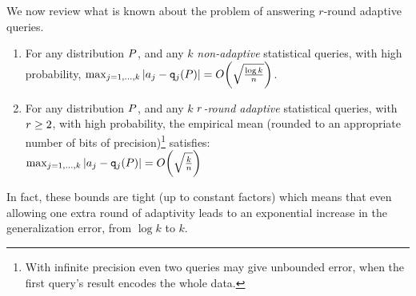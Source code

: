 We now review what is known about the problem of answering $r$-round adaptive queries.  
\begin{thm} 
\label{thm:nonadapt-adapt}
\begin{enumerate}

\item For any distribution $P$, and any $k$ \emph{non-adaptive} statistical queries, with high probability,
$
\max_{j=1,\dots,k} | \answer_j - \qquery_j(\dist) | = O\left( \sqrt{\frac{\log k}{n}}  \right)
$.
%
\item For any distribution $P$, and  any $k$  \emph{$r$-round adaptive} statistical queries, with $r \geq 2$, with high probability, the empirical mean (rounded to an appropriate number of bits of precision)\footnote{With infinite precision even two queries may give unbounded error, when the first query's result encodes the whole data.} satisfies:\\
$
\max_{j=1,\dots,k} | \answer_j - \qquery_j(\dist) | = O\left( \sqrt{  \frac{k}{n}}  \right)
$
\end{enumerate}
\end{thm}
In fact, these bounds are tight (up to constant factors) which means that even allowing one extra round of adaptivity leads to an exponential increase in the generalization error, from $\log k$ to $k$.

